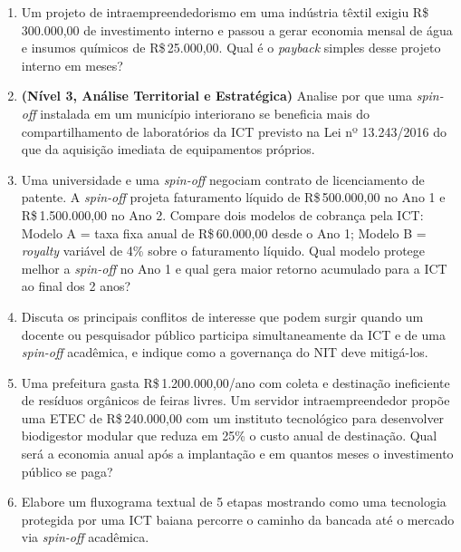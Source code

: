 \begin{enumerate}[leftmargin=1.5em, itemsep=6pt]
  \item Um projeto de intraempreendedorismo em uma indústria têxtil exigiu R\$\,300.000,00 de investimento interno e passou a gerar economia mensal de água e insumos químicos de R\$\,25.000,00. Qual é o \textit{payback} simples desse projeto interno em meses?
  \espacoResolucao[2.1cm]

  \item \textbf{(Nível 3, Análise Territorial e Estratégica)} Analise por que uma \textit{spin-off} instalada em um município interiorano se beneficia mais do compartilhamento de laboratórios da ICT previsto na Lei nº 13.243/2016 do que da aquisição imediata de equipamentos próprios.
  \espacoResolucao[2.2cm]

  \item Uma universidade e uma \textit{spin-off} negociam contrato de licenciamento de patente. A \textit{spin-off} projeta faturamento líquido de R\$\,500.000,00 no Ano 1 e R\$\,1.500.000,00 no Ano 2. Compare dois modelos de cobrança pela ICT: Modelo A = taxa fixa anual de R\$\,60.000,00 desde o Ano 1; Modelo B = \textit{royalty} variável de 4\% sobre o faturamento líquido. Qual modelo protege melhor a \textit{spin-off} no Ano 1 e qual gera maior retorno acumulado para a ICT ao final dos 2 anos?
  \espacoResolucao[2.5cm]

  \item Discuta os principais conflitos de interesse que podem surgir quando um docente ou pesquisador público participa simultaneamente da ICT e de uma \textit{spin-off} acadêmica, e indique como a governança do NIT deve mitigá-los.
  \espacoResolucao[2.2cm]

  \item Uma prefeitura gasta R\$\,1.200.000,00/ano com coleta e destinação ineficiente de resíduos orgânicos de feiras livres. Um servidor intraempreendedor propõe uma ETEC de R\$\,240.000,00 com um instituto tecnológico para desenvolver biodigestor modular que reduza em 25\% o custo anual de destinação. Qual será a economia anual após a implantação e em quantos meses o investimento público se paga?
  \espacoResolucao[2.4cm]

  \item Elabore um fluxograma textual de 5 etapas mostrando como uma tecnologia protegida por uma ICT baiana percorre o caminho da bancada até o mercado via \textit{spin-off} acadêmica.
  \espacoResolucao[2.3cm]
\end{enumerate}


